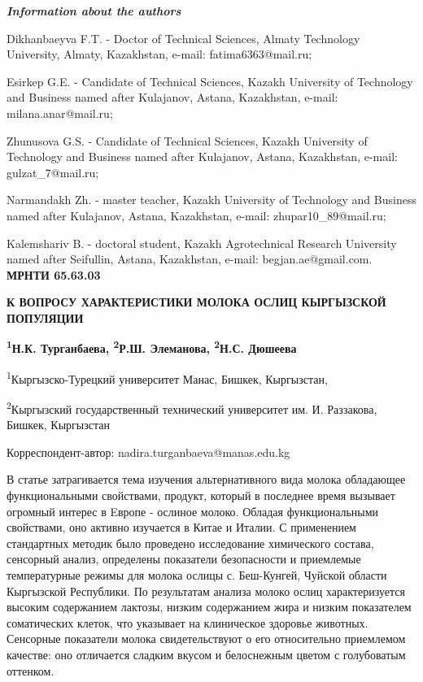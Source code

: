 \emph{{\bfseries Information about the authors}}

Dikhanbaeyva F.T. - Doctor of Technical Sciences, Almaty Technology
University, Almaty, Kazakhstan, e-mail: fatima6363@mail.ru;

Esirkep G.E. - Candidate of Technical Sciences, Kazakh University of
Technology and Business named after Kulajanov, Astana, Kazakhstan,
e-mail: milana.anar@mail.ru;

Zhunusova G.S. - Candidate of Technical Sciences, Kazakh University of
Technology and Business named after Kulajanov, Astana, Kazakhstan,
e-mail: gulzat\_7@mail.ru;

Narmandakh Zh. - master teacher, Kazakh University of Technology and
Business named after Kulajanov, Astana, Kazakhstan, e-mail:
zhupar10\_89@mail.ru;

Kalemshariv B. - doctoral student, Kazakh Agrotechnical Research
University named after Seifullin, Astana, Kazakhstan, e-mail:
begjan.ae@gmail.com.\newpage
{\bfseries МРНТИ 65.63.03}

{\bfseries К ВОПРОСУ ХАРАКТЕРИСТИКИ МОЛОКА ОСЛИЦ КЫРГЫЗСКОЙ ПОПУЛЯЦИИ}

{\bfseries \textsuperscript{1}Н.К. Турганбаева, \textsuperscript{2}Р.Ш.
Элеманова, \textsuperscript{2}Н.С. Дюшеева}

\textsuperscript{1}Кыргызско-Турецкий университет Манас, Бишкек,
Кыргызстан,

\textsuperscript{2}Кыргызский государственный технический университет
им. И. Раззакова, Бишкек, Кыргызстан

Корреспондент-автор: nadira.turganbaeva@manas.edu.kg

В статье затрагивается тема изучения альтернативного вида молока
обладающее функциональными свойствами, продукт, который в последнее
время вызывает огромный интерес в Eвропе - ослиное молоко. Обладая
функциональными свойствами, оно активно изучается в Китае и Италии. С
применением стандартных методик было проведено исследование химического
состава, сенсорный анализ, определены показатели безопасности и
приемлемые температурные режимы для молока ослицы с. Беш-Кунгей, Чуйской
области Кыргызской Республики. По результатам анализа молоко ослиц
характеризуется высоким содержанием лактозы, низким содержанием жира и
низким показателем соматических клеток, что указывает на клиническое
здоровье животных. Сенсорные показатели молока свидетельствуют о его
относительно приемлемом качестве: оно отличается сладким вкусом и
белоснежным цветом с голубоватым оттенком.

